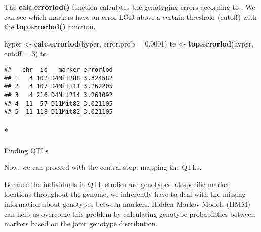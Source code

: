 \documentclass[12pt,]{book}
\newenvironment{Shaded}{\begin{snugshade}}{\end{snugshade}}
\newcommand{\KeywordTok}[1]{\textcolor[rgb]{0.27,0.27,0.27}{\textbf{{#1}}}}
\newcommand{\DataTypeTok}[1]{\textcolor[rgb]{0.27,0.27,0.27}{{#1}}}
\newcommand{\DecValTok}[1]{\textcolor[rgb]{0.06,0.06,0.06}{{#1}}}
\newcommand{\FloatTok}[1]{\textcolor[rgb]{0.06,0.06,0.06}{{#1}}}
\newcommand{\StringTok}[1]{\textcolor[rgb]{0.5,0.5,0.5}{{#1}}}
\newcommand{\OtherTok}[1]{\textcolor[rgb]{0.37,0.37,0.37}{{#1}}}
\newcommand{\NormalTok}[1]{{#1}}
\let\oldparagraph\paragraph
\renewcommand{\paragraph}[1]{\oldparagraph{#1}\mbox{}}
\begin{document}
The \textbf{calc.errorlod()} function calculates the genotyping errors
according to \citet{Lincoln1992604}. We can see which markers have an
error LOD above a certain threshold (cutoff) with the
\textbf{top.errorlod()} function.

\begin{Shaded}
\begin{Highlighting}[]
\NormalTok{hyper <-}\StringTok{ }\KeywordTok{calc.errorlod}\NormalTok{(hyper, }\DataTypeTok{error.prob =} \FloatTok{0.0001}\NormalTok{)}
\NormalTok{te <-}\StringTok{ }\KeywordTok{top.errorlod}\NormalTok{(hyper, }\DataTypeTok{cutoff =} \DecValTok{3}\NormalTok{)}
\NormalTok{te}
\end{Highlighting}
\end{Shaded}

\begin{verbatim}
##   chr  id   marker errorlod
## 1   4 102 D4Mit288 3.324582
## 2   4 107 D4Mit111 3.262205
## 3   4 216 D4Mit214 3.261092
## 4  11  57 D11Mit82 3.021105
## 5  11 118 D11Mit82 3.021105
\end{verbatim}

\begin{Shaded}
\end{Shaded}

\paragraph*{Finding QTLs}\label{finding-qtls}

Now, we can proceed with the central step: mapping the QTLs.

Because the individuals in QTL studies are genotyped at specific marker
locations throughout the genome, we inherently have to deal with the
missing information about genotypes between markers. Hidden Markov
Models (HMM) can help us overcome this problem by calculating genotype
probabilities between markers based on the joint genotype distribution.
\end{document}
